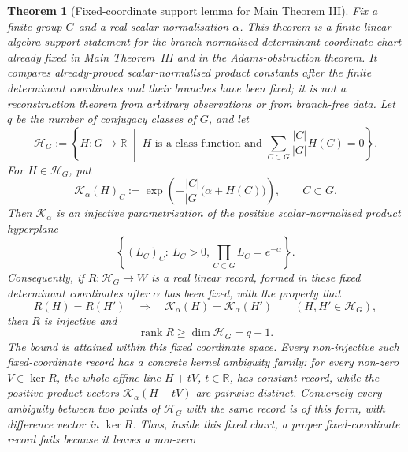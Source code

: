 \documentclass[11pt,a4paper]{amsart}
\theoremstyle{plain}
\newtheorem{theorem}{Theorem}[section]
\theoremstyle{definition}
\theoremstyle{remark}
\newcommand{\RR}{\mathbb{R}}
\begin{document}
\begin{theorem}[Fixed-coordinate support lemma for Main Theorem III]
  \label{thm:class-product-minimal-obstruction-skeleton}
  \label{cor:class-product-minimal-obstruction-skeleton}
  Fix a finite group \(G\) and a real scalar normalisation \(\alpha\).  This
  theorem is a finite linear-algebra support statement for the
  branch-normalised determinant-coordinate chart already fixed in Main
  Theorem~III and in the Adams-obstruction theorem.  It compares
  already-proved scalar-normalised product constants after the finite
  determinant coordinates and their branches have been fixed; it is not a
  reconstruction theorem from arbitrary observations or from branch-free data.
  Let
  \(q\) be the number of conjugacy classes of \(G\), and let
  \[
    \mathcal H_G:=
    \left\{H:G\to\RR\;\middle|\;
      H\text{ is a class function and }
      \sum_{C\subset G}\frac{|C|}{|G|}H(C)=0
    \right\}.
  \]
  For \(H\in\mathcal H_G\), put
  \begin{equation}\label{eq:fixed-coordinate-support-product-map}
    \mathcal K_\alpha(H)_C:=
    \exp\!\left(-\frac{|C|}{|G|}\bigl(\alpha+H(C)\bigr)\right),
    \qquad C\subset G .
  \end{equation}
  Then \(\mathcal K_\alpha\) is an injective parametrisation of the positive
  scalar-normalised product hyperplane
  \[
    \left\{(L_C)_C:\ L_C>0,
      \prod_{C\subset G}L_C=e^{-\alpha}\right\}.
  \]
  Consequently, if \(R:\mathcal H_G\to W\) is a real linear record, formed in
  these fixed determinant coordinates after \(\alpha\) has been fixed, with
  the property that
  \[
    R(H)=R(H')\quad\Longrightarrow\quad
    \mathcal K_\alpha(H)=\mathcal K_\alpha(H')
    \qquad(H,H'\in\mathcal H_G),
  \]
  then \(R\) is injective and
  \begin{equation}\label{eq:fixed-coordinate-support-rank-bound}
    \operatorname{rank}R\ge \dim\mathcal H_G=q-1 .
  \end{equation}
  The bound is attained within this fixed coordinate space.  Every
  non-injective such fixed-coordinate record has a concrete kernel ambiguity
  family:
  for every non-zero \(V\in\ker R\), the whole affine line \(H+tV\),
  \(t\in\RR\), has constant record, while the positive product vectors
  \(\mathcal K_\alpha(H+tV)\) are pairwise distinct.  Conversely every
  ambiguity between two points of \(\mathcal H_G\) with the same record is of
  this form, with difference vector in \(\ker R\).  Thus, inside this fixed
  chart, a proper fixed-coordinate record fails because it leaves a non-zero

\end{theorem}
\end{document}
